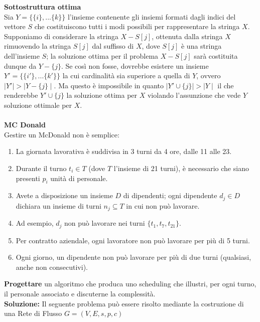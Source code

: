 \documentclass[../cheatSheetAlgoritmi.tex]{subfiles}
\begin{document}
\textbf{Sottostruttura ottima} \\
Sia $Y = \{\{i\}, ... \{k\}\}$ l'insieme contenente gli insiemi formati dagli indici del vettore $S$ che costituiscono tutti i modi possibili per rappresentare la stringa $X$. \\
Supponiamo di considerare la stringa $X - {S[j]}$, ottenuta dalla stringa $X$ rimuovendo la stringa $S[j]$ dal suffisso di $X$, dove $S[j]$ è una stringa dell'insieme $S$; la soluzione ottima per il problema $X - {S[j]}$ sarà costituita dunque da $Y - \{j\}$. Se così non fosse, dovrebbe esistere un insieme $Y' = \{\{i'\}, ... \{k'\}\}$ la cui cardinalità sia superiore a quella di $Y$, ovvero $\mid Y' \mid > \mid Y - \{j\} \mid$. Ma questo è impossibile in quanto $\mid Y' \cup \{j\} \mid > \mid Y \mid$ il che renderebbe $Y' \cup \{j\}$ la soluzione ottima per $X$ violando l'assunzione che vede $Y$ soluzione ottimale per $X$.\\\\
\textbf{MC Donald}\\
Gestire un McDonald non è semplice:
\begin{enumerate}
	\item La giornata lavorativa è suddivisa in 3 turni da 4 ore, dalle 11 alle 23.
	\item Durante il turno $t_{i} \in T$ (dove $T$ l'insieme di 21 turni), è necessario che siano presenti $p_{i}$ unità di personale. 
	\item Avete a disposizione un insieme $D$ di dipendenti; ogni dipendente $d_{j} \in D$ dichiara un insieme di turni $n_{j} \subseteq T$ in cui non può lavorare.
	\item Ad esempio, $d_{j}$ non può lavorare nei turni $\{t_{1}, t_{7}, t_{21}\}$.
	\item Per contratto aziendale, ogni lavoratore non può lavorare per più di 5 turni.
	\item Ogni giorno, un dipendente non può lavorare per più di due turni (qualsiasi, anche non consecutivi).
\end{enumerate}
\textbf{Progettare} un algoritmo che produca uno scheduling che illustri, per ogni turno, il personale associato e discuterne la complessità.\\
\textbf{Soluzione:} Il seguente problema può essere risolto mediante la costruzione di una Rete di Flusso $G = (V, E, s, p, c)$
\end{document}
